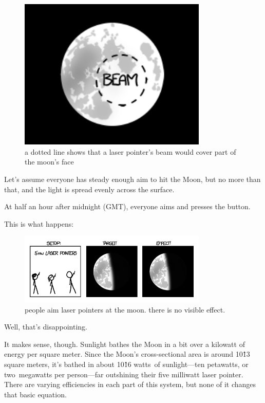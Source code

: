 \begin{figure}[!htbp]
\centering
\includegraphics[scale=0.5, max width=0.8\textwidth]{imgs/a/13/laser_pointer_beam_width.png}
\caption{a dotted line shows that a laser pointer's beam would cover part of the moon's face}
\end{figure}

{Let’s assume everyone has steady enough aim to hit the Moon, but no more than that, and the light is spread evenly across the surface.}

{At half an hour after midnight (GMT), everyone aims and presses the button.}

{This is what happens:}

\begin{figure}[!htbp]
\centering
\includegraphics[scale=0.5, max width=0.8\textwidth]{imgs/a/13/laser_pointer_5mw.png}
\caption{people aim laser pointers at the moon. there is no visible effect.}
\end{figure}

{Well, that’s disappointing.}

{It makes sense, though. Sunlight bathes the Moon in a bit over a kilowatt of energy per square meter. Since the Moon’s cross-sectional area is around 10\^13 square meters, it’s bathed in about 10\^16 watts of sunlight—ten petawatts, or two megawatts per person—far outshining their five milliwatt laser pointer. There are varying efficiencies in each part of this system, but none of it changes that basic equation.}

